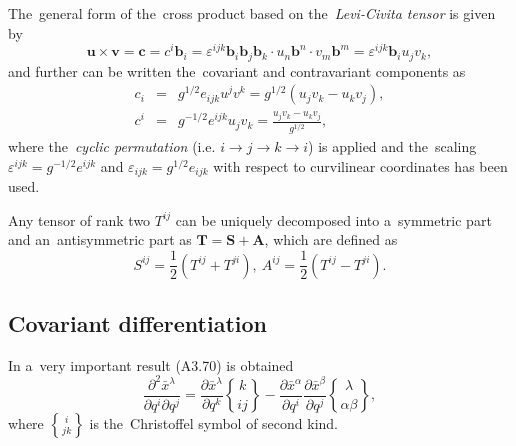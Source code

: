 \documentclass[review]{elsarticle}
\newcommand{\pdv}[2]{\frac{\partial{#1}}{\partial{#2}}}
\newcommand{\vect}[1]{\boldsymbol{#1}}
\newcommand{\matr}[1]{\mathbf{#1}}
\newcommand{\christ}[3]{\genfrac{\{}{\}}{0pt}{}{#1}{#2 #3}}
\begin{document}
The~general form of the~cross product 
based on the~\textit{Levi-Civita tensor} is given by
\begin{equation}
  \vect{u}\times\vect{v} = \vect{c} = c^i\vect{b}_i = 
  \varepsilon^{ijk}\vect{b}_i\vect{b}_j\vect{b}_k 
  \cdot u_n\vect{b}^n \cdot v_m\vect{b}^m 
  = \varepsilon^{ijk}\vect{b}_i u_j v_k ,
  \nonumber 
\end{equation}
and further can be written the~covariant and contravariant components as
\begin{eqnarray}
  c_i &=& g^{1/2}e_{ijk}u^j v^k = g^{1/2}(u_j v_k - u_k v_j) ,
  \label{eq:general_covariant_cross_product}\\
  c^i &=& g^{-1/2}e^{ijk}u_j v_k = \frac{u_j v_k - u_k v_j}{g^{1/2}} ,
  \label{eq:general_contravariant_cross_product}
\end{eqnarray}
where the~\textit{cyclic permutation} 
(i.e. $i\rightarrow j \rightarrow k \rightarrow i$) is applied 
and the~scaling $\varepsilon^{ijk} = g^{-1/2}e^{ijk}$ and
$\varepsilon_{ijk} = g^{1/2}e_{ijk}$ with respect to curvilinear coordinates
has been used. 

Any tensor of rank two $T^{ij}$ can be uniquely decomposed into a~symmetric 
part and an~antisymmetric part as $\matr{T} = \matr{S} + \matr{A}$, 
which are defined as
\begin{equation}
  S^{ij} = \frac{1}{2}(T^{ij} + T^{ji}),~
  A^{ij} = \frac{1}{2}(T^{ij} - T^{ji}) .
  \label{eq:matrix_decomposition}
\end{equation}

\subsection{Covariant differentiation}
In \cite{Mihalas_Mihalas-Foundations_of_Radiation_Hydrodynamics} a~very 
important result (A3.70) is obtained
\begin{equation}
  \frac{\partial^2\bar{x}^\lambda}{\partial q^i\partial q^j} = 
  \pdv{\bar{x}^\lambda}{q^k}\christ{k}{i}{j} -
  \pdv{\bar{x}^\alpha}{q^i}\pdv{\bar{x}^\beta}{q^j}
  \christ{\lambda}{\alpha}{\beta} ,
  \label{eq:Christ_result}
\end{equation}
where $\christ{i}{j}{k}$ is the~Christoffel symbol of second kind.
\end{document}
